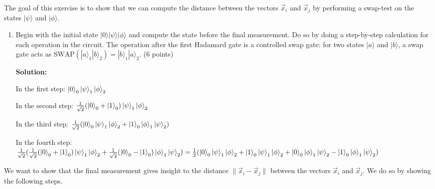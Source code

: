 \documentclass[12pt]{article}
\begin{document}
    The goal of this exercise is to show that we can compute the distance between the vectors $\vec{x}_i$ and $\vec{x}_j$ by performing a swap-test on the states $|\psi\rangle$ and $|\phi\rangle$.



    \begin{enumerate}[start=3]
        \item Begin with the initial state $|0\rangle|\psi\rangle|\phi\rangle$ and compute the state before the final measurement. Do so by doing a step-by-step calculation for each operation in the circuit. The operation after the first Hadamard gate is a controlled swap gate: for two states $|a\rangle$ and $|b\rangle$, a swap gate acts as $\text{SWAP}(|a\rangle_1|b\rangle_2) = |b\rangle_1|a\rangle_2$. (6 points)
    
        \textbf{Solution:}

        In the first step:
        $\ket{0}_0\ket{\psi}_1\ket{\phi}_2$

        In the second step:
        $\frac{1}{\sqrt{2}}(\ket{0}_0+\ket{1}_0)\ket{\psi}_1\ket{\phi}_2$

        In the third step:
        $\frac{1}{\sqrt{2}}(\ket{0}_0\ket{\psi}_1\ket{\phi}_2+\ket{1}_0\ket{\phi}_1\ket{\psi}_2)$

        In the fourth step:
        $\frac{1}{\sqrt{2}}(\frac{1}{\sqrt{2}}(\ket{0}_0+\ket{1}_0)\ket{\psi}_1\ket{\phi}_2
        +\frac{1}{\sqrt{2}}(\ket{0}_0-\ket{1}_0)\ket{\phi}_1\ket{\psi}_2)
        \\=\frac{1}{2}(\ket{0}_0\ket{\psi}_1\ket{\phi}_2+\ket{1}_0\ket{\psi}_1\ket{\phi}_2
        +\ket{0}_0\ket{\phi}_1\ket{\psi}_2-\ket{1}_0\ket{\phi}_1\ket{\psi}_2)
        $
        
    
    \end{enumerate}

        We want to show that the final measurement gives insight to the distance $\|\vec{x}_i - \vec{x}_j\|$ between the vectors $\vec{x}_i$ and $\vec{x}_j$.
    We do so by showing the following steps.
\end{document}
